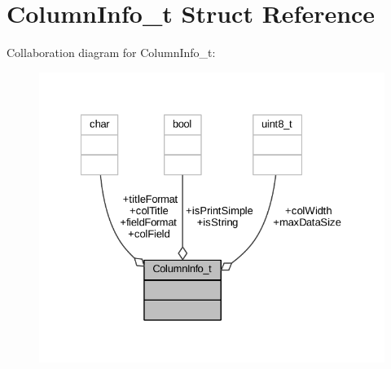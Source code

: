 \hypertarget{struct_column_info__t}{}\section{Column\+Info\+\_\+t Struct Reference}
\label{struct_column_info__t}


Collaboration diagram for Column\+Info\+\_\+t\+:
\nopagebreak
\begin{figure}[H]
\begin{center}
\leavevmode
\includegraphics[width=328pt]{struct_column_info__t__coll__graph}
\end{center}
\end{figure}
